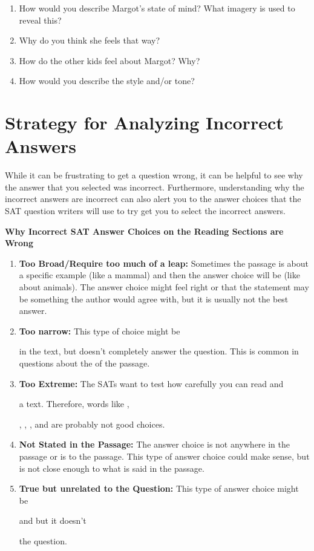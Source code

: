 \documentclass[12pt]{book}
\newcommand{\longline}{\underline{\hspace{2in}} }
\begin{document}
\begin{enumerate}
\item How would you describe Margot's state of mind?  What imagery is used to reveal this?
\vfill\item Why do you think she feels that way?
\vfill\item How do the other kids feel about Margot?  Why?
\vfill\item How would you describe the style and/or tone?
\end{enumerate}

\vfill
\section[Strategy]{Strategy for Analyzing Incorrect Answers}
While it can be frustrating to get a question wrong, it can be helpful to see why the answer that you selected was incorrect. Furthermore, understanding why the incorrect answers are incorrect can also alert you to the answer choices that the SAT question writers will use to try get you to select the incorrect answers. 

\bigskip
\textbf{Why Incorrect SAT Answer Choices on the Reading Sections are Wrong}

\begin{enumerate}
\item \textbf{Too Broad/Require too much of a leap:} Sometimes the passage is about a specific example (like a mammal) and then the answer choice will be \longline (like about animals). The answer choice might feel right or that the statement may be something the author would agree with, but it is usually not the best answer. 

\item \textbf{Too narrow:} This type of choice might be

\longline in the text, but doesn't completely answer the question. This is common in questions about the \longline of the passage.

\item \textbf{Too Extreme:} The SATs want to test how carefully you can read and

\longline a text. Therefore, words like \longline,

\longline, \longline, \longline, and \longline are probably not good choices. 


\item \textbf{Not Stated in the Passage:} The answer choice is not \longline anywhere in the passage or is \longline to the passage. This type of answer choice could make sense, but is not close enough to what is said in the passage. 

\item \textbf{True but unrelated to the Question:} This type of answer choice might be

\longline and \longline but it doesn't

\longline the question. 
\end{enumerate}
\end{document}
